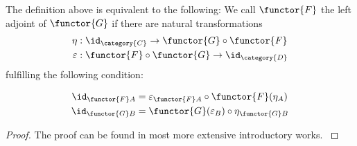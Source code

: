 \documentclass[DIN, pagenumber=false, fontsize=11pt, parskip=half, colorinlistoftodos, svgnames]{scrartcl}
\begin{document}
	\begin{proposition}
		The definition above is equivalent to the following: 
		We call $\functor{F} $ the left adjoint of $\functor{G} $ if there are natural transformations 
		\begin{align*}
			\eta &: \id_\category{C} \rightarrow \functor{G} \circ \functor{F}
			\\
			\varepsilon &: \functor{F} \circ \functor{G} \rightarrow \id_\category{D}
		\end{align*}
		fulfilling the following condition: 
		
		\begin{align*}
			\id_{\functor{F}A} 
			&= \varepsilon_{\functor{F}A} \circ \functor{F}(\eta_A)
			\\
			\id_{\functor{G}B} 
			&= \functor{G}(\varepsilon_B) \circ \eta_{\functor{G}B}
		\end{align*}
		
		\iffalse
		i.e. the following diagrams commute:
		\begin{center}
			\begin{tikzcd}
				&
				\functor{F} \circ \functor{G} \circ \functor{F}
				\arrow[rd, "\varepsilon \bullet \functor{F} " ]
				&
				\\
				\functor{F}\id_\category{C}
				\arrow[ru, "\functor{F} \bullet \eta " ]
				\arrow[rr, equal, "\id" ]
				&
				&
				\id_\category{C} \circ \functor{F}
			\end{tikzcd}
			\begin{tikzcd}
				&
				\functor{G} \circ \functor{F} \circ \functor{G}
				\arrow[rd, "\functor{G} \bullet \varepsilon " ]
				&
				\\
				\id_\category{C} \circ \functor{G}
				\arrow[ru, "\eta \bullet \functor{G} "]\
				\arrow[rr, equal, "\id " ]
				&
				&
				\functor{G} \circ \id_\category{D}
			\end{tikzcd}
		\end{center}
		\todo[inline]{cut triangle diagrams or define $\bullet $ } %
		\fi
		
	\end{proposition}
	
	\begin{proof}
		The proof can be found in most more extensive introductory works. \cite{brandenburg}
	\end{proof}	
		
\end{document}
